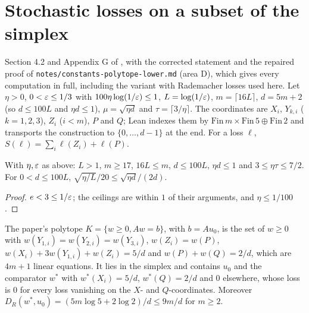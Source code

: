 \chapter{Stochastic losses on a subset of the simplex}
\label{chap:polytope_lower}

Section 4.2 and Appendix G of \cite{SSKM26}, with the corrected statement and the repaired proof
of \texttt{notes/constants-polytope-lower.md} (area D), which gives every computation in full,
including the variant with Rademacher losses used here. Let $\eta > 0$, $0 < \varepsilon \le 1/3$ with
$100\eta\log(1/\varepsilon) \le 1$, $L = \log(1/\varepsilon)$, $m = \lceil 16L\rceil$, $d = 5m + 2$ (so
$d \le 100L$ and $\eta d \le 1$), $\mu = \sqrt{\eta d}$ and $\tau = \lceil 3/\eta\rceil$. The
coordinates are $X_i$, $Y_{k,i}$ ($k = 1, 2, 3$), $Z_i$ ($i < m$), $P$ and $Q$; Lean indexes them
by $\mathrm{Fin}\,m \times \mathrm{Fin}\,5 \oplus \mathrm{Fin}\,2$ and transports the construction to $\{0, \dots, d - 1\}$ at the
end. For a loss $\ell$, $S(\ell) = \sum_i \ell(Z_i) + \ell(P)$.

\begin{lemma}
  \label{lem:polytope_lower_params}
  \leanok
  With $\eta, \varepsilon$ as above: $L > 1$, $m \ge 17$, $16L \le m$, $d \le 100L$, $\eta d \le 1$ and
  $3 \le \eta\tau \le 7/2$. For $0 < d \le 100L$, $\sqrt{\eta/L}/20 \le \sqrt{\eta d}/(2d)$.
\end{lemma}

\begin{proof}
  \leanok
  $e < 3 \le 1/\varepsilon$; the ceilings are within $1$ of their arguments, and $\eta \le 1/100$.
\end{proof}

\begin{lemma}
  \label{lem:polytope_lower_polytope}
  \leanok
  The paper's polytope $K = \{w \ge 0, Aw = b\}$, with $b = Au_0$, is the set of $w \ge 0$ with
  $w(Y_{1,i}) = w(Y_{2,i}) = w(Y_{3,i})$, $w(Z_i) = w(P)$, $w(X_i) + 3w(Y_{1,i}) + w(Z_i) = 5/d$ and
  $w(P) + w(Q) = 2/d$, which are $4m + 1$ linear equations. It lies in the simplex and contains
  $u_0$ and the comparator $w^*$ with $w^*(X_i) = 5/d$, $w^*(Q) = 2/d$ and $0$ elsewhere, whose loss
  is $0$ for every loss vanishing on the $X$- and $Q$-coordinates. Moreover
  $D_R(w^*, u_0) = (5m\log 5 + 2\log 2)/d \le 9m/d$ for $m \ge 2$.
\end{lemma}

